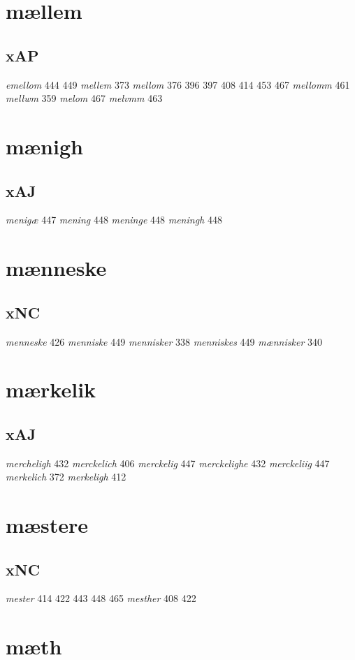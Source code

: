 \documentclass[a4paper,twocolumn]{article}
\begin{document}
\section{mællem}
\label{sec:org6fa184c}
\subsection{xAP}
\label{sec:orgd724f9f}
\emph{emellom} 444 449 \emph{mellem} 373 \emph{mellom} 376 396 397 408 414 453 467 \emph{mellomm} 461 \emph{mellwm} 359 \emph{melom} 467 \emph{melvmm} 463 
\section{mænigh}
\label{sec:orgf962a0d}
\subsection{xAJ}
\label{sec:orgfbf1aae}
\emph{menigæ} 447 \emph{mening} 448 \emph{meninge} 448 \emph{meningh} 448 
\section{mænneske}
\label{sec:orgd035a01}
\subsection{xNC}
\label{sec:org405e14e}
\emph{menneske} 426 \emph{menniske} 449 \emph{mennisker} 338 \emph{menniskes} 449 \emph{mænnisker} 340 
\section{mærkelik}
\label{sec:org07c1a9c}
\subsection{xAJ}
\label{sec:orgb6f4e5b}
\emph{mercheligh} 432 \emph{merckelich} 406 \emph{merckelig} 447 \emph{merckelighe} 432 \emph{merckeliig} 447 \emph{merkelich} 372 \emph{merkeligh} 412 
\section{mæstere}
\label{sec:org06a37c6}
\subsection{xNC}
\label{sec:orgc9a95a4}
\emph{mester} 414 422 443 448 465 \emph{mesther} 408 422 
\section{mæth}
\label{sec:org358912b}
\end{document}
